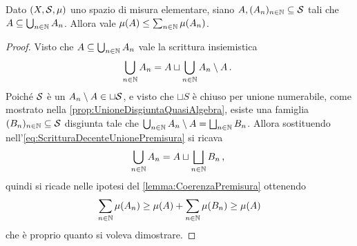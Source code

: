 \begin{lemma}\label{lemma:PiuCheMonotonaPremisura}
	Dato $(X,\S,\mu)$ uno spazio di misura elementare, siano $A,(A_n)_{n\in\N}\subseteq \S$ tali che $A\subseteq\bigcup_{n\in\N}A_n$.
	Allora vale $\mu(A)\le \sum_{n\in\N}\mu(A_n)$.
\end{lemma}
\begin{proof}
	Visto che $A\subseteq\bigcup_{n\in\N}A_n$ vale la scrittura insiemistica
	\begin{equation}\label{eq:ScritturaDecenteUnionePremisura}
		\bigcup_{n\in\N}A_n=A\sqcup\bigcup_{n\in\N}A_n\setminus A \punto
	\end{equation}
	Poiché $\S$ è un \semiring{} $A_n\setminus A\in \sqcup \S$, e visto che $\sqcup S$ è chiuso per unione numerabile, come mostrato nella \cref{prop:UnioneDisgiuntaQuasiAlgebra}, esiste una famiglia $(B_n)_{n\in\N}\subseteq\S$ disgiunta tale che $\bigcup_{n\in\N}A_n\setminus A=\bigsqcup_{n\in\N}B_n$.
	Allora sostituendo nell'\cref{eq:ScritturaDecenteUnionePremisura} si ricava
	\begin{equation*}
		\bigcup_{n\in\N}A_n=A\sqcup\bigsqcup_{n\in\N}B_n \virgola
	\end{equation*}
	quindi si ricade nelle ipotesi del \cref{lemma:CoerenzaPremisura} ottenendo
	\begin{equation*}
		\sum_{n\in\N}\mu(A_n)\ge \mu(A)+\sum_{n\in\N}\mu(B_n)\ge \mu(A)
	\end{equation*}
	che è proprio quanto si voleva dimostrare.
\end{proof}



